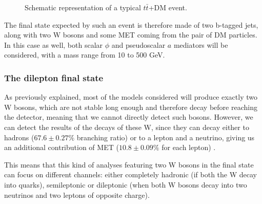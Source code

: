 \documentclass[a4paper, 10pt, openright]{report}
\begin{document}
\begin{figure}[htbp]
\begin{center}
\caption{Schematic representation of a typical $t \bar t$+DM event.}
\label{fig:ttDMFeynman}
\end{center}
\end{figure}

The final state expected by such an event is therefore made of two b-tagged jets, along with two W bosons and some \ac{MET} coming from the pair of \ac{DM} particles. In this case as well, both scalar $\phi$ and pseudoscalar $a$ mediators will be considered, with a mass range from 10 to 500 GeV.

\subsubsection{The dilepton final state} \label{subsection:diLeptonFS}

As previously explained, most of the models considered will produce exactly two W bosons, which are not stable long enough and therefore decay before reaching the detector, meaning that we cannot directly detect such bosons. However, we can detect the results of the decays of these W, since they can decay either to hadrons ($67.6 \pm 0.27 \%$ branching ratio) or to a lepton and a neutrino, giving us an additional contribution of \ac{MET} ($10.8 \pm 0.09 \%$ for each lepton) \cite{PDG}.

This means that this kind of analyses featuring two W bosons in the final state can focus on different channels: either completely hadronic (if both the W decay into quarks), semileptonic or dileptonic (when both W bosons decay into two neutrinos and two leptons of opposite charge). 
\end{document}
